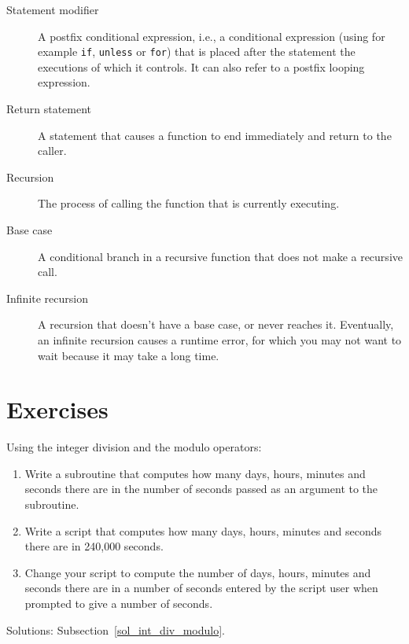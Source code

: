 \begin{description}
\item[Statement modifier] A postfix conditional expression, i.e., 
a conditional expression (using for example {\tt if}, {\tt unless} or 
{\tt for}) that is placed after the statement the executions of which 
it controls. It can also refer to a postfix looping expression.

\item[Return statement] A statement that causes a function to
end immediately and return to the caller.

\item[Recursion]  The process of calling the function that is
currently executing.

\item[Base case]  A conditional branch in a
recursive function that does not make a recursive call.

\item[Infinite recursion]  A recursion that doesn't have a
base case, or never reaches it.  Eventually, an infinite 
recursion causes a runtime error, for which you may not want 
to wait because it may take a long time.

\end{description}

\section{Exercises}
%

\begin{exercise}
%
Using the integer division and the modulo operators:
\label{int_div_modulo}

\begin{enumerate}

\item Write a subroutine that computes how many days, hours, minutes and seconds there are in the number of seconds passed as an argument to the subroutine.

\item Write a script that computes how many days, hours, minutes and seconds there are in 240,000 seconds.

\item Change your script to compute the number of days, hours, minutes and seconds there are in a number of seconds entered by the script user when prompted to give a number of seconds.

\end{enumerate}

Solutions: Subsection~\ref{sol_int_div_modulo}.

\end{exercise}


